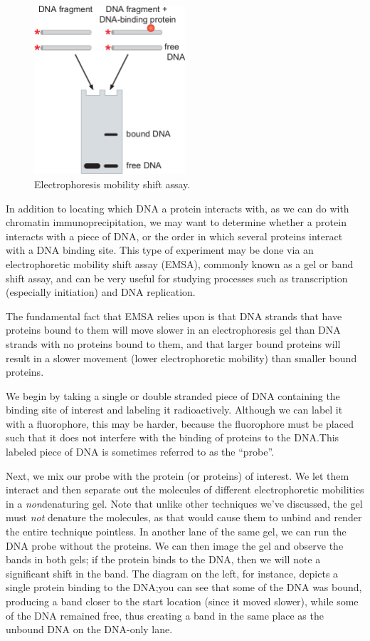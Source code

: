 \documentclass{article}
\begin{document}
\begin{figure}[h!]
    \begin{center}
        \includegraphics[width=0.5\textwidth]{images/emsa.png}
    \end{center}
    \caption{
        Electrophoresis mobility shift assay.
    }
\end{figure}

In addition to locating which DNA a protein interacts with, as we can do with chromatin
immunoprecipitation, we may want to determine whether a protein interacts with a piece of DNA, or
the order in which several proteins interact with a DNA binding site. This type of experiment may be
done via an electrophoretic mobility shift assay (EMSA), commonly known as a gel or band shift
assay, and can be very useful for studying processes such as transcription (especially initiation)
and DNA replication.

The fundamental fact that EMSA relies upon is that DNA strands that have proteins bound to them will
move slower in an electrophoresis gel than DNA strands with no proteins bound to them, and that
larger bound proteins will result in a slower movement (lower electrophoretic mobility) than smaller
bound proteins. 

We begin by taking a single or double stranded piece of DNA containing the binding site of interest
and labeling it radioactively. Although we can label it with a fluorophore, this may be harder,
because the fluorophore must be placed such that it does not interfere with the binding of proteins
to the DNA.\@ This labeled piece of DNA is sometimes referred to as the ``probe''. 

Next, we mix our probe with the protein (or proteins) of interest. We let them interact and then
separate out the molecules of different electrophoretic mobilities in a \emph{non}denaturing gel.
Note that unlike other techniques we've discussed, the gel must \emph{not} denature the molecules,
as that would cause them to unbind and render the entire technique pointless. In another lane of the
same gel, we can run the DNA probe without the proteins. We can then image the gel and observe the
bands in both gels; if the protein binds to the DNA, then we will note a significant shift in the
band. The diagram on the left, for instance, depicts a single protein binding to the DNA;\@ you can
see that some of the DNA was bound, producing a band closer to the start location (since it moved
slower), while some of the DNA remained free, thus creating a band in the same place as the unbound
DNA on the DNA-only lane.
\end{document}
